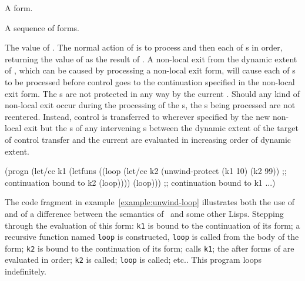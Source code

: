 \begin{optDefinition}
%
\Syntax
{}%
%
\begin{arguments}
    \item[\scdef{protected-form}] A form.
    \item[\scseqref{after-form}] A sequence of forms.
\end{arguments}
%
\result%
The value of .
%
\remarks%
The normal action of  is to process
 and then each of s in order, returning
the value of  as the result of .
A non-local exit from the dynamic extent of , which can be
caused by processing a non-local exit form, will cause each of
s to be processed before control goes to the continuation
specified in the non-local exit form.  The s are not protected
in any way by the current .  Should any kind of
non-local exit occur during the processing of the s, the
s being processed are not reentered.  Instead, control is
transferred to wherever specified by the new non-local exit but the
s of any intervening s between the
dynamic extent of the target of control transfer and the current
 are evaluated in increasing order of dynamic extent.
%
\examples
%
\begin{example}
\label{example:unwind-loop}
{\codeExample
(progn
  (let/cc k1
    (letfuns
      ((loop
         (let/cc k2
           (unwind-protect (k1 10) (k2 99))
         ;; continuation bound to k2
         (loop))))
      (loop)))
  ;; continuation bound to k1
  ...)
\endCodeExample}
\end{example}
%
The code fragment in example~\ref{example:unwind-loop} illustrates both the use
of  and of a difference between the semantics of
\eulisp\ and some other Lisps.  Stepping through the evaluation of this form:
{\tt k1} is bound to the continuation of its  form; a
recursive function named {\tt loop} is constructed, {\tt loop} is called from
the body of the  form; {\tt k2} is bound to the continuation
of its  form;  calls {\tt k1}; the
after forms of  are evaluated in order; {\tt k2} is
called; {\tt loop} is called; etc..  This program loops indefinitely.
%
\end{optDefinition}

